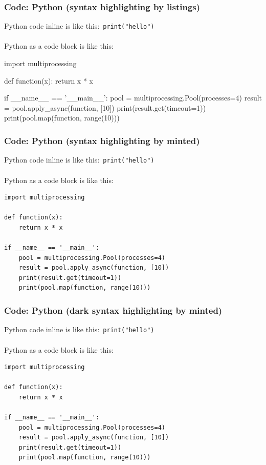 \begin{frame}[fragile]
\frametitle{Code: Python (syntax highlighting by listings)}
Python code inline is like this:~\lstinline[style=pythonstyle]!print("hello")!\\\\
Python as a code block is like this:\\
\begin{python}
import multiprocessing

def function(x):
    return x * x

if __name__ == '__main__':
    pool = multiprocessing.Pool(processes=4)
    result = pool.apply_async(function, [10])
    print(result.get(timeout=1))
    print(pool.map(function, range(10)))
\end{python}
\end{frame}

\begin{frame}[fragile]
\frametitle{Code: Python (syntax highlighting by minted)}
Python code inline is like this:~\texttt{print("hello")}\\\\
Python as a code block is like this:\\
\begin{verbatim}
import multiprocessing

def function(x):
    return x * x

if __name__ == '__main__':
    pool = multiprocessing.Pool(processes=4)
    result = pool.apply_async(function, [10])
    print(result.get(timeout=1))
    print(pool.map(function, range(10)))
\end{verbatim}
\end{frame}

\begin{frame}[fragile]
\frametitle{Code: Python (dark syntax highlighting by minted)}
Python code inline is like this:~\texttt{print("hello")}\\\\
Python as a code block is like this:\\
\color{white255255255}
\begin{verbatim}
import multiprocessing

def function(x):
    return x * x

if __name__ == '__main__':
    pool = multiprocessing.Pool(processes=4)
    result = pool.apply_async(function, [10])
    print(result.get(timeout=1))
    print(pool.map(function, range(10)))
\end{verbatim}
\end{frame}

